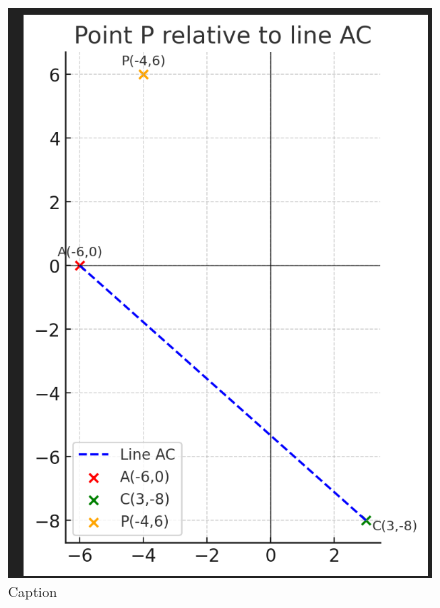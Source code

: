 \begin{figure}
    \centering
    \includegraphics[width=0.5\linewidth]{Fig1.png}
    \caption{Caption}
    \label{fig:placeholder}
\end{figure}

